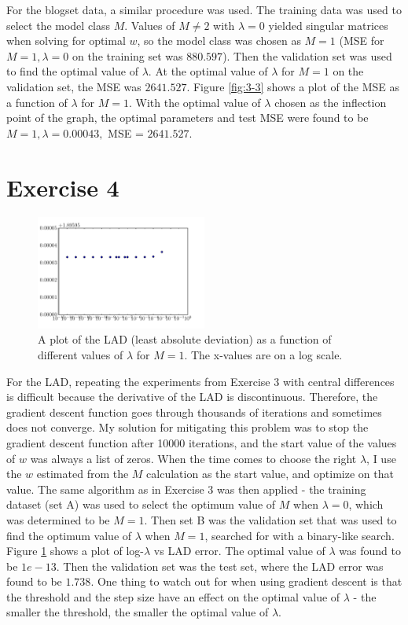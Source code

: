 \documentclass[10pt]{article}
\begin{document}
For the blogset data, a similar procedure was used. The training data was used to select the model class $M$. Values of $M \neq 2$ with $\lambda = 0$ yielded singular matrices when solving for optimal $w$, so the model class was chosen as $M = 1$ (MSE for $M = 1, \lambda = 0$ on the training set was $880.597$). Then the validation set was used to find the optimal value of $\lambda$. At the optimal value of $\lambda$ for $M = 1$ on the validation set, the MSE was $2641.527$. Figure \ref{fig:3-3} shows a plot of the MSE as a function of $\lambda$ for $M = 1$. With the optimal value of $\lambda$ chosen as the inflection point of the graph, the optimal parameters and test MSE were found to be $M = 1, \lambda = 0.00043,$ MSE = $2641.527$. 

\section{Exercise 4}

\begin{figure}[!ht]
	\centering
	\includegraphics[width=0.5\textwidth]{exercise4-1.pdf}
	\caption{A plot of the LAD (least absolute deviation) as a function of different values of $\lambda$ for $M = 1$. The x-values are on a log scale.}
	\label{fig:4-1}
\end{figure}

For the LAD, repeating the experiments from Exercise 3 with central differences is difficult because the derivative of the LAD is discontinuous. Therefore, the gradient descent function goes through thousands of iterations and sometimes does not converge. My solution for mitigating this problem was to stop the gradient descent function after 10000 iterations, and the start value of the values of $w$ was always a list of zeros. When the time comes to choose the right $\lambda$, I use the $w$ estimated from the $M$ calculation as the start value, and optimize on that value. The same algorithm as in Exercise 3 was then applied - the training dataset (set A) was used to select the optimum value of $M$ when $\lambda = 0$, which was determined to be $M = 1$. Then set B was the validation set that was used to find the optimum value of $\lambda$ when $M = 1$, searched for with a binary-like search. Figure \ref{fig:4-1} shows a plot of log-$\lambda$ vs LAD error. The optimal value of $\lambda$ was found to be $1e-13$. Then the validation set was the test set, where the LAD error was found to be $1.738$. One thing to watch out for when using gradient descent is that the threshold and the step size have an effect on the optimal value of $\lambda$ - the smaller the threshold, the smaller the optimal value of $\lambda$. 
\end{document}
